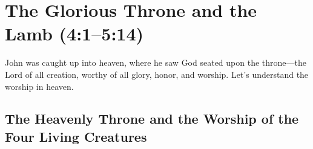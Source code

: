 \chapter{The Glorious Throne and the Lamb (4:1--5:14)}

John was caught up into heaven, where he saw God seated upon the throne—the Lord of all creation, worthy of all glory, honor, and worship.
Let's understand the worship in heaven.

\section{The Heavenly Throne and the Worship of the Four Living Creatures}


